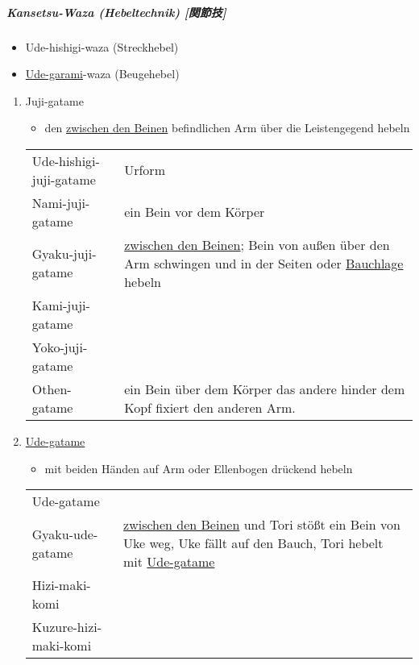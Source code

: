 \documentclass[justified, a4paper, notitlepage, captions=tableheading, nobib]{tufte-handout}
\begin{document}
\subparagraph{Kansetsu-Waza (Hebeltechnik) [関節技] }
\label{sec:orgfb30679}

\begin{itemize}
\item Ude-hishigi-waza (Streckhebel)
\item \hyperref[org52f11cf]{Ude-garami}-waza (Beugehebel)
\end{itemize}

\begin{enumerate}
\item Juji-gatame
\label{sec:org08cc7c7}

\begin{itemize}
\item den \hyperref[org891f77f]{zwischen den Beinen} befindlichen Arm über die Leistengegend hebeln
\end{itemize}

\begin{center}
\begin{tabular}{ll}
\label{orgfcb6e26}Ude-hishigi-juji-gatame & Urform\\
\label{org61e3694}Nami-juji-gatame & ein Bein vor dem Körper\\
\label{org3151e34}Gyaku-juji-gatame & \hyperref[org891f77f]{zwischen den Beinen}; Bein von außen über den Arm schwingen und in der Seiten oder \hyperref[org22fd945]{Bauchlage} hebeln\\
\label{org579a66b}Kami-juji-gatame & \\
\label{org85c3a81}Yoko-juji-gatame & \\
\label{orgd826776}Othen-gatame & ein Bein über dem Körper das andere hinder dem Kopf fixiert den anderen Arm.\\
\end{tabular}
\end{center}

\item \hyperref[org79aac92]{Ude-gatame}
\label{sec:org4ab833c}

\begin{itemize}
\item mit beiden Händen auf Arm oder Ellenbogen drückend hebeln
\end{itemize}

\begin{center}
\begin{tabular}{ll}
\label{org79aac92}Ude-gatame & \\
\label{org78cd888}Gyaku-ude-gatame & \hyperref[org891f77f]{zwischen den Beinen} und Tori stößt ein Bein von Uke weg, Uke fällt auf den Bauch, Tori hebelt mit \hyperref[org79aac92]{Ude-gatame}\\
\label{org33ae6ac}Hizi-maki-komi & \\
\label{org26a988e}Kuzure-hizi-maki-komi & \\
\end{tabular}
\end{center}


\end{enumerate}
\end{document}
